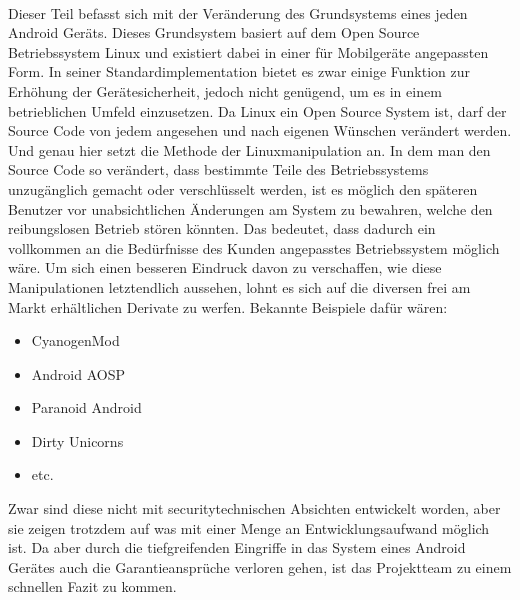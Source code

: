 \paragraph*{}
Dieser Teil befasst sich mit der Veränderung des Grundsystems eines jeden Android Geräts. Dieses Grundsystem basiert auf dem Open Source Betriebssystem Linux und existiert dabei in einer für Mobilgeräte angepassten Form. In seiner Standardimplementation bietet es zwar einige Funktion zur Erhöhung der Gerätesicherheit, jedoch nicht genügend, um es in einem betrieblichen Umfeld einzusetzen. Da Linux ein Open Source System ist, darf der Source Code von jedem angesehen und nach eigenen Wünschen verändert werden. Und genau hier setzt die Methode der Linuxmanipulation an. In dem man den Source Code so verändert, dass bestimmte Teile des Betriebssystems unzugänglich gemacht oder verschlüsselt werden, ist es möglich den späteren Benutzer vor unabsichtlichen Änderungen am System zu bewahren, welche den reibungslosen Betrieb stören könnten. Das bedeutet, dass dadurch ein vollkommen an die Bedürfnisse des Kunden angepasstes Betriebssystem möglich wäre. Um sich einen besseren Eindruck davon zu verschaffen, wie diese Manipulationen letztendlich aussehen, lohnt es sich auf die diversen frei am Markt erhältlichen Derivate zu werfen. Bekannte Beispiele dafür wären:
\begin{itemize}
	\item CyanogenMod
	\item Android AOSP
	\item Paranoid Android
	\item Dirty Unicorns
	\item etc.
\end{itemize}
Zwar sind diese nicht mit securitytechnischen Absichten entwickelt worden, aber sie zeigen trotzdem auf was mit einer Menge an Entwicklungsaufwand möglich ist. Da aber durch die tiefgreifenden Eingriffe in das System eines Android Gerätes auch die Garantieansprüche verloren gehen, ist das Projektteam zu einem schnellen Fazit zu kommen.
